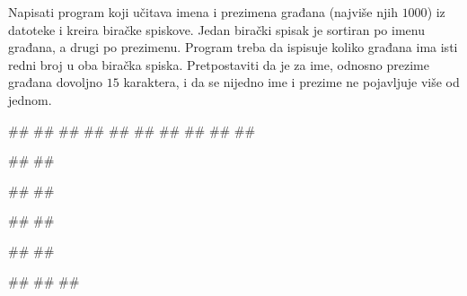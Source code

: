 \begin{Answer}[ref=3-18]
\end{Answer}
\begin{Exercise}[label=3-19]
  Napisati program koji učitava imena i prezimena građana (najviše
  njih $1000$) iz datoteke  i kreira biračke
  spiskove. Jedan birački spisak je sortiran po imenu građana, a drugi
  po prezimenu. Program treba da ispisuje koliko građana ima isti
  redni broj u oba biračka spiska. Pretpostaviti da je za ime, odnosno
  prezime građana dovoljno $15$ karaktera, i da se nijedno ime i
  prezime ne pojavljuje više od jednom.

\begin{minitest}
\begin{test}{1}
##    
##
##
##
##
##
##
##
##
##

#\naslovIzlaz#
##
\end{test}
\end{minitest}
\begin{minitest}
\begin{test}{2}
##
##
  
#\naslovIzlaz#
##
\end{test}
\end{minitest}
\begin{minitest}
\begin{test}{3}
##
##
  
#\naslovIzlaz#
##
##
\end{test}
\end{minitest}
  
\end{Exercise}

